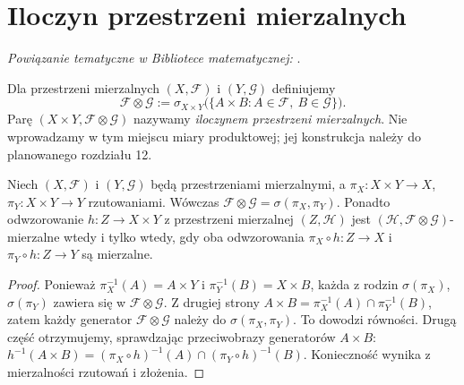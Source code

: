 \section{Iloczyn przestrzeni mierzalnych}

\noindent\emph{Powiązanie tematyczne w Bibliotece matematycznej:} .


\begin{definicja}
\label{def:product-sigma}
Dla przestrzeni mierzalnych $(X,\mathcal F)$ i
$(Y,\mathcal G)$ definiujemy
\[
\mathcal F\otimes\mathcal G
:=\sigma_{X\times Y}\bigl(\{A\times B:A\in\mathcal F,\ B\in\mathcal G\}\bigr).
\]
Parę $(X\times Y,\mathcal F\otimes\mathcal G)$
nazywamy \emph{iloczynem przestrzeni mierzalnych}.
Nie wprowadzamy w tym miejscu miary produktowej;
jej konstrukcja należy do planowanego rozdziału 12.
\end{definicja}

\begin{twierdzenie}
\label{thm:product-projections}
Niech $(X,\mathcal F)$ i $(Y,\mathcal G)$ będą
przestrzeniami mierzalnymi, a
$\pi_X:X\times Y\to X$, $\pi_Y:X\times Y\to Y$
rzutowaniami. Wówczas
$\mathcal F\otimes\mathcal G=\sigma(\pi_X,\pi_Y)$.
Ponadto odwzorowanie $h:Z\to X\times Y$ z przestrzeni
mierzalnej $(Z,\mathcal H)$ jest
$(\mathcal H,\mathcal F\otimes\mathcal G)$-mierzalne
wtedy i tylko wtedy, gdy oba odwzorowania
$\pi_X\circ h:Z\to X$ i $\pi_Y\circ h:Z\to Y$ są mierzalne.
\end{twierdzenie}
\begin{proof}
Ponieważ $\pi_X^{-1}(A)=A\times Y$ i
$\pi_Y^{-1}(B)=X\times B$, każda z rodzin
$\sigma(\pi_X)$, $\sigma(\pi_Y)$ zawiera się w
$\mathcal F\otimes\mathcal G$. Z drugiej strony
$A\times B=\pi_X^{-1}(A)\cap\pi_Y^{-1}(B)$,
zatem każdy generator $\mathcal F\otimes\mathcal G$
należy do $\sigma(\pi_X,\pi_Y)$. To dowodzi równości.
Drugą część otrzymujemy, sprawdzając przeciwobrazy
generatorów $A\times B$:
$h^{-1}(A\times B)=(\pi_X\circ h)^{-1}(A)
\cap(\pi_Y\circ h)^{-1}(B)$.
Konieczność wynika z mierzalności rzutowań i złożenia.
\end{proof}

